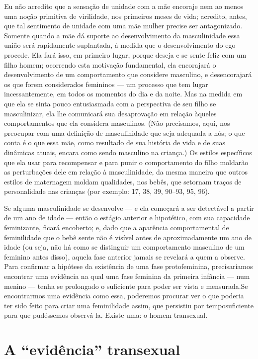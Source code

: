 Eu não acredito que a sensação de unidade com a mãe encoraje nem ao
menos uma noção primitiva de virilidade, nos primeiros meses de vida;
acredito, antes, que tal sentimento de unidade com uma mãe mulher
precise ser antagonizado. Somente quando a mãe dá suporte ao
desenvolvimento da masculinidade essa união será rapidamente
suplantada, à medida que o desenvolvimento do ego procede.
Ela fará isso, em primeiro lugar, porque deseja e se sente feliz com um
filho homem; ocorrendo esta motivação fundamental, ela encorajará o
desenvolvimento de um comportamento que considere masculino, e
desencorajará os que forem considerados femininos --- um processo que
tem lugar incessantemente, em todos os momentos do dia e da noite. Mas
na medida em que ela se sinta pouco entusiasmada com a perspectiva de
seu filho se masculinizar, ela lhe comunicará sua desaprovação em
relação àqueles comportamentos que ela considera masculinos. (Não
precisamos, aqui, nos preocupar com uma definição de masculinidade que
seja adequada a nós; o que conta é o que essa mãe, como resultado de
sua história de vida e de suas dinâmicas atuais, encara como sendo
masculino na criança.) Os estilos específicos que ela usar para
recompensar e para punir o comportamento do filho moldarão as
perturbações dele em relação à masculinidade, da mesma maneira que
outros estilos de maternagem moldam qualidades, nos bebês, que se\idxfreudmascu[|)]
tornam traços de personalidade nas crianças (por exemplo: 17, 38, 39,
90--93, 95, 96).

Se alguma masculinidade se desenvolve --- e ela começará a ser
detectável a partir de um ano de idade --- então o estágio anterior e
hipotético, com sua capacidade feminizante, ficará encoberto; e, dado
que a aparência comportamental de feminilidade que o bebê sente não é
visível antes de aproximadamente um ano de idade (ou seja, não há como
se distinguir um comportamento masculino de um feminino antes disso),
aquela fase anterior jamais se revelará a quem a observe. Para
confirmar a hipótese da existência de uma fase protofeminina,\idxmascufas{}
precisaríamos encontrar uma evidência na qual uma fase feminina da
primeira infância --- num menino --- tenha se prolongado o suficiente
para poder ser vista e mensurada.\idxmascu[|)] Se encontrarmos uma evidência como
essa, poderemos procurar ver o que poderia ter sido feito para criar
uma feminilidade assim, que persistiu por tempo\idxmascupap[|)] suficiente para que
pudéssemos observá-la. Existe uma: o homem transexual.\idxtranse[|(]

\section{A ``evidência'' transexual}

